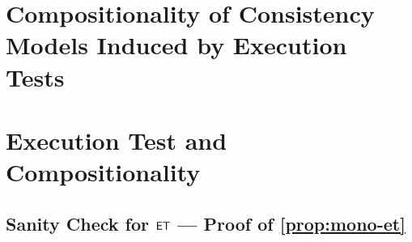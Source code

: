 \ifTechReport
\section{Compositionality of Consistency Models Induced by Execution Tests}
\else
\section{Execution Test and Compositionality}
\subsection{Sanity Check for \( \mathsf{ET} \) --- Proof of \cref{prop:mono-et} }

\label{sec:mono-et}
\fi



%
